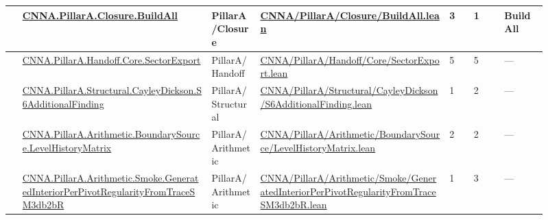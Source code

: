 \begin{longtable}{L{0.025\linewidth} L{0.315\linewidth} L{0.08\linewidth} L{0.315\linewidth} L{0.045\linewidth} L{0.055\linewidth} L{0.07\linewidth}}
\hline
{} & \href{run:repo_snapshot/CNNA/PillarA/Closure/BuildAll.lean}{CNNA.\allowbreak{}PillarA.\allowbreak{}Closure.\allowbreak{}BuildAll} & PillarA/\allowbreak{}Closure & \href{run:repo_snapshot/CNNA/PillarA/Closure/BuildAll.lean}{CNNA/\allowbreak{}PillarA/\allowbreak{}Closure/\allowbreak{}BuildAll.\allowbreak{}lean} & 3 & 1 & BuildAll\\
\hline
{} & \href{run:repo_snapshot/CNNA/PillarA/Handoff/Core/SectorExport.lean}{CNNA.\allowbreak{}PillarA.\allowbreak{}Handoff.\allowbreak{}Core.\allowbreak{}SectorExport} & PillarA/\allowbreak{}Handoff & \href{run:repo_snapshot/CNNA/PillarA/Handoff/Core/SectorExport.lean}{CNNA/\allowbreak{}PillarA/\allowbreak{}Handoff/\allowbreak{}Core/\allowbreak{}SectorExport.\allowbreak{}lean} & 5 & 5 & ---\\
\hline
{} & \href{run:repo_snapshot/CNNA/PillarA/Structural/CayleyDickson/S6AdditionalFinding.lean}{CNNA.\allowbreak{}PillarA.\allowbreak{}Structural.\allowbreak{}CayleyDickson.\allowbreak{}S6AdditionalFinding} & PillarA/\allowbreak{}Structural & \href{run:repo_snapshot/CNNA/PillarA/Structural/CayleyDickson/S6AdditionalFinding.lean}{CNNA/\allowbreak{}PillarA/\allowbreak{}Structural/\allowbreak{}CayleyDickson/\allowbreak{}S6AdditionalFinding.\allowbreak{}lean} & 1 & 2 & ---\\
\hline
{} & \href{run:repo_snapshot/CNNA/PillarA/Arithmetic/BoundarySource/LevelHistoryMatrix.lean}{CNNA.\allowbreak{}PillarA.\allowbreak{}Arithmetic.\allowbreak{}BoundarySource.\allowbreak{}LevelHistoryMatrix} & PillarA/\allowbreak{}Arithmetic & \href{run:repo_snapshot/CNNA/PillarA/Arithmetic/BoundarySource/LevelHistoryMatrix.lean}{CNNA/\allowbreak{}PillarA/\allowbreak{}Arithmetic/\allowbreak{}BoundarySource/\allowbreak{}LevelHistoryMatrix.\allowbreak{}lean} & 2 & 2 & ---\\
\hline
{} & \href{run:repo_snapshot/CNNA/PillarA/Arithmetic/Smoke/GeneratedInteriorPerPivotRegularityFromTraceSM3db2bR.lean}{CNNA.\allowbreak{}PillarA.\allowbreak{}Arithmetic.\allowbreak{}Smoke.\allowbreak{}GeneratedInteriorPerPivotRegularityFromTraceSM3db2bR} & PillarA/\allowbreak{}Arithmetic & \href{run:repo_snapshot/CNNA/PillarA/Arithmetic/Smoke/GeneratedInteriorPerPivotRegularityFromTraceSM3db2bR.lean}{CNNA/\allowbreak{}PillarA/\allowbreak{}Arithmetic/\allowbreak{}Smoke/\allowbreak{}GeneratedInteriorPerPivotRegularityFromTraceSM3db2bR.\allowbreak{}lean} & 1 & 3 & ---\\

\end{longtable}
